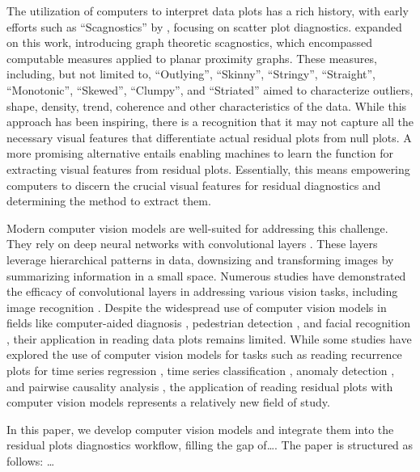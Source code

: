 \documentclass[]{interact}
\theoremstyle{plain}%
\theoremstyle{definition}
\theoremstyle{remark}
\begin{document}
The utilization of computers to interpret data plots has a rich history,
with early efforts such as ``Scagnostics'' by \citet{tukey1985computer},
focusing on scatter plot diagnostics. \citet{wilkinson2005graph}
expanded on this work, introducing graph theoretic scagnostics, which
encompassed computable measures applied to planar proximity graphs.
These measures, including, but not limited to, ``Outlying'', ``Skinny'',
``Stringy'', ``Straight'', ``Monotonic'', ``Skewed'', ``Clumpy'', and
``Striated'' aimed to characterize outliers, shape, density, trend,
coherence and other characteristics of the data. While this approach has
been inspiring, there is a recognition \citep{buja2009statistical} that
it may not capture all the necessary visual features that differentiate
actual residual plots from null plots. A more promising alternative
entails enabling machines to learn the function for extracting visual
features from residual plots. Essentially, this means empowering
computers to discern the crucial visual features for residual
diagnostics and determining the method to extract them.

Modern computer vision models are well-suited for addressing this
challenge. They rely on deep neural networks with convolutional layers
\citep{fukushima1982neocognitron}. These layers leverage hierarchical
patterns in data, downsizing and transforming images by summarizing
information in a small space. Numerous studies have demonstrated the
efficacy of convolutional layers in addressing various vision tasks,
including image recognition \citep{rawat2017deep}. Despite the
widespread use of computer vision models in fields like computer-aided
diagnosis \citep{lee2015image}, pedestrian detection
\citep{brunetti2018computer}, and facial recognition
\citep{emami2012facial}, their application in reading data plots remains
limited. While some studies have explored the use of computer vision
models for tasks such as reading recurrence plots for time series
regression \citep{ojeda2020multivariate}, time series classification
\citep{chu2019automatic, hailesilassie2019financial, hatami2018classification, zhang2020encoding},
anomaly detection \citep{chen2020convolutional}, and pairwise causality
analysis \citep{singh2017deep}, the application of reading residual
plots with computer vision models represents a relatively new field of
study.

In this paper, we develop computer vision models and integrate them into
the residual plots diagnostics workflow, filling the gap of\ldots. The
paper is structured as follows: \ldots{}
\end{document}
